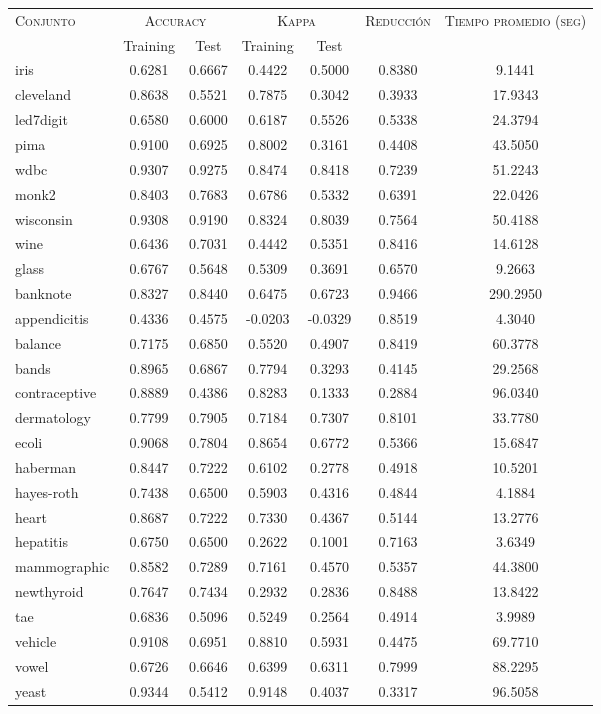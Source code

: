 \begin{table}[]
\centering
\begin{tabular}{l c c c c c c}
\hline
\multirow{2}{*}{\textsc{Conjunto}}
	& \multicolumn{2}{c}{\textsc{Accuracy}}
	& \multicolumn{2}{c}{\textsc{Kappa}}
	& \textsc{Reducción}
	& \textsc{Tiempo promedio (seg)} \\
	& Training & Test
	& Training & Test \\ 
\hline
\hline

iris & 0.6281 & 0.6667 & 0.4422 & 0.5000 & 0.8380 & 9.1441 \\
cleveland & 0.8638 & 0.5521 & 0.7875 & 0.3042 & 0.3933 & 17.9343 \\
led7digit & 0.6580 & 0.6000 & 0.6187 & 0.5526 & 0.5338 & 24.3794 \\
pima & 0.9100 & 0.6925 & 0.8002 & 0.3161 & 0.4408 &  43.5050 \\
wdbc & 0.9307 & 0.9275 & 0.8474 & 0.8418 & 0.7239 &  51.2243 \\
monk2 & 0.8403 & 0.7683 & 0.6786 & 0.5332 & 0.6391 & 22.0426 \\
wisconsin & 0.9308 & 0.9190 & 0.8324 & 0.8039 & 0.7564 &  50.4188 \\
wine & 0.6436 & 0.7031 & 0.4442 & 0.5351 & 0.8416 & 14.6128 \\
glass & 0.6767 & 0.5648 & 0.5309 & 0.3691 & 0.6570 & 9.2663 \\
banknote & 0.8327 & 0.8440 & 0.6475 & 0.6723 & 0.9466 & 290.2950 \\
appendicitis & 0.4336 & 0.4575 & -0.0203 & -0.0329 & 0.8519 & 4.3040 \\
balance & 0.7175 & 0.6850 & 0.5520 & 0.4907 & 0.8419 &  60.3778 \\
bands & 0.8965 & 0.6867 & 0.7794 & 0.3293 & 0.4145 &  29.2568 \\
contraceptive & 0.8889 & 0.4386 & 0.8283 & 0.1333 & 0.2884 &  96.0340 \\
dermatology & 0.7799 & 0.7905 & 0.7184 & 0.7307 & 0.8101 &  33.7780 \\
ecoli & 0.9068 & 0.7804 & 0.8654 & 0.6772 & 0.5366 & 15.6847 \\
haberman & 0.8447 & 0.7222 & 0.6102 & 0.2778 & 0.4918 & 10.5201 \\
hayes-roth & 0.7438 & 0.6500 & 0.5903 & 0.4316 & 0.4844 & 4.1884 \\
heart & 0.8687 & 0.7222 & 0.7330 & 0.4367 & 0.5144 & 13.2776 \\
hepatitis & 0.6750 & 0.6500 & 0.2622 & 0.1001 & 0.7163 & 3.6349 \\
mammographic & 0.8582 & 0.7289 & 0.7161 & 0.4570 & 0.5357 &  44.3800 \\
newthyroid & 0.7647 & 0.7434 & 0.2932 & 0.2836 & 0.8488 & 13.8422 \\
tae & 0.6836 & 0.5096 & 0.5249 & 0.2564 & 0.4914 & 3.9989 \\
vehicle & 0.9108 & 0.6951 & 0.8810 & 0.5931 & 0.4475 &  69.7710 \\
vowel & 0.6726 & 0.6646 & 0.6399 & 0.6311 & 0.7999 &  88.2295 \\
yeast & 0.9344 & 0.5412 & 0.9148 & 0.4037 & 0.3317 &  96.5058 \\


\end{tabular}
\end{table}
